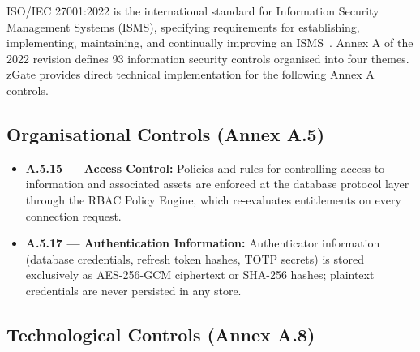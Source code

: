 ISO/IEC 27001:2022 is the international standard for Information Security Management Systems (ISMS), specifying requirements for establishing, implementing, maintaining, and continually improving an ISMS~\cite{iso27001-2022}. Annex A of the 2022 revision defines 93 information security controls organised into four themes. zGate provides direct technical implementation for the following Annex A controls.

\subsection{Organisational Controls (Annex A.5)}

\begin{itemize}
    \item \textbf{A.5.15 --- Access Control:} Policies and rules for controlling access to information and associated assets are enforced at the database protocol layer through the RBAC Policy Engine, which re-evaluates entitlements on every connection request.
    \item \textbf{A.5.17 --- Authentication Information:} Authenticator information (database credentials, refresh token hashes, TOTP secrets) is stored exclusively as AES-256-GCM ciphertext or SHA-256 hashes; plaintext credentials are never persisted in any store.
\end{itemize}

\subsection{Technological Controls (Annex A.8)}

